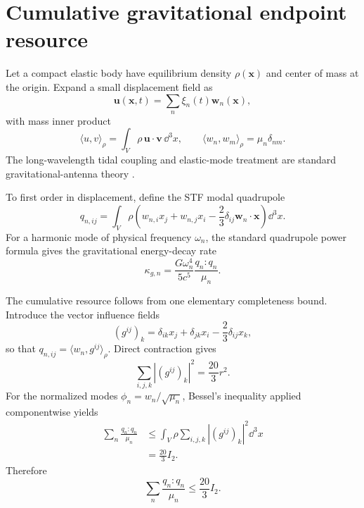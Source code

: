 \section{Cumulative gravitational endpoint resource}
\label{sec:resource}

Let a compact elastic body have equilibrium density $\rho(\bm x)$ and center of mass at the origin. Expand a small displacement field as
\begin{equation}
\bm u(\bm x,t)=\sum_n \xi_n(t)\bm w_n(\bm x),
\end{equation}
with mass inner product
\begin{equation}
\langle u,v\rangle_\rho=\int_V\rho\,\bm u\cdot\bm v\,\dd^3x,
\qquad
\langle w_n,w_m\rangle_\rho=\mu_n\delta_{nm}.
\end{equation}
The long-wavelength tidal coupling and elastic-mode treatment are standard gravitational-antenna theory \cite{Hirakawa1976,Lobo1995}.

To first order in displacement, define the STF modal quadrupole
\begin{equation}
q_{n,ij}
=\int_V\rho\left(
 w_{n,i}x_j+w_{n,j}x_i
-\frac23\delta_{ij}\bm w_n\cdot\bm x
\right)\dd^3x .
\label{eq:qn}
\end{equation}
For a harmonic mode of physical frequency $\omega_n$, the standard quadrupole power formula gives the gravitational energy-decay rate
\begin{equation}
\boxed{
\kappa_{g,n}
=\frac{G\omega_n^4}{5c^5}
\frac{q_n:q_n}{\mu_n} .
}
\label{eq:kappan}
\end{equation}

The cumulative resource follows from one elementary completeness bound. Introduce the vector influence fields
\begin{equation}
(g^{ij})_k
=\delta_{ik}x_j+\delta_{jk}x_i
-\frac23\delta_{ij}x_k,
\end{equation}
so that $q_{n,ij}=\langle w_n,g^{ij}\rangle_\rho$. Direct contraction gives
\begin{equation}
\boxed{
\sum_{i,j,k}|(g^{ij})_k|^2=\frac{20}{3}r^2 .
}
\label{eq:20over3}
\end{equation}
For the normalized modes $\phi_n=w_n/\sqrt{\mu_n}$, Bessel's inequality applied componentwise yields
\begin{align}
\sum_n\frac{q_n:q_n}{\mu_n}
&\le
\int_V\rho\sum_{i,j,k}|(g^{ij})_k|^2\dd^3x \\
&=\frac{20}{3}I_2 .
\end{align}
Therefore
\begin{equation}
\boxed{
\sum_n\frac{q_n:q_n}{\mu_n}\le\frac{20}{3}I_2 .
}
\label{eq:qsum}
\end{equation}


